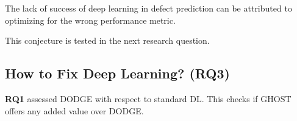 \documentclass[10pt,compsoc,twocolumn]{IEEEtran}
\begin{document}
 \begin{blockquote}
     \noindent
     The  lack of success  of  deep  learning  in  defect prediction  can  be  attributed  to  optimizing  for  the wrong performance metric.
 \end{blockquote}

This conjecture is tested in the next research question.

\subsection{  How to Fix Deep Learning? {\bf (RQ3)}}
\label{sec:rq3}

{\bf RQ1} assessed DODGE with respect to  standard DL. This checks if    GHOST  offers any added value over DODGE.
 


\end{document}
